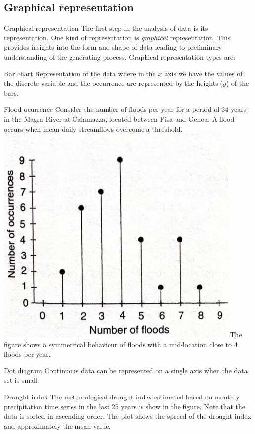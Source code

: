 \documentclass[8pt]{beamer}
\begin{document}
\subsection{Graphical representation}
\begin{frame}{Graphical representation}
    The first step in the analysis of data is its representation. One kind of representation is \emph{graphical} representation. This provides insights into the form and shape of data leading to preliminary understanding of the generating process. Graphical representation types are:

    \begin{minipage}{0.49\textwidth}{\alert{Bar chart}}
        Representation of the data where in the $x$ axis we have the values of the discrete variable and the occurrence are represented by the heights ($y$) of the bars. 
    \begin{exampleblock}{Flood ocurrence}
        Consider the number of floods per year for a period of 34 years in the Magra River at Calamazza, located between Pisa and Genoa. A flood occurs when mean daily streamflows overcome a threshold.  
    \includegraphics[width=0.9\textwidth]{fi111.jpeg}
    The figure shows a symmetrical behaviour of floods with a mid-location close to 4 floods per year.
    \end{exampleblock}
\end{minipage}
\hfill
\begin{minipage}{0.495\textwidth}{\alert{Dot diagram}}
Continuous data can be represented on a single axis when the data set is small. 
    \begin{exampleblock}{Drought index}
       The meteorological drought index estimated based on monthly precipitation time series in the last 25 years is show in the figure. Note that the data is sorted in ascending order. 
    The plot shows the spread of the drought index and approximately the mean value.
    \end{exampleblock}
\end{minipage}
\end{frame}
\end{document}
